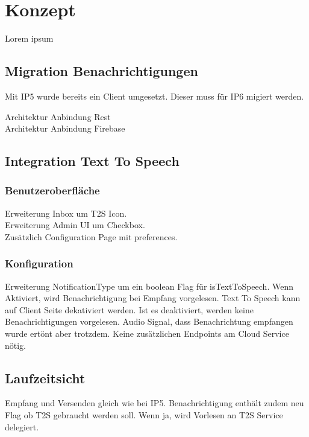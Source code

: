 \section{Konzept}

Lorem ipsum

\subsection{Migration Benachrichtigungen}

Mit IP5 wurde bereits ein Client umgesetzt.
Dieser muss für IP6 migiert werden.

Architektur Anbindung Rest \\
Architektur Anbindung Firebase \\

\clearpage


\subsection{Integration Text To Speech}

\subsubsection*{Benutzeroberfläche}

Erweiterung Inbox um T2S Icon. \\
Erweiterung Admin UI um Checkbox. \\
Zusätzlich Configuration Page mit preferences. \\

\subsubsection*{Konfiguration}
Erweiterung NotificationType um ein boolean Flag für isTextToSpeech.
Wenn Aktiviert, wird Benachrichtigung bei Empfang vorgelesen.
Text To Speech kann auf Client Seite dekativiert werden.
Ist es deaktiviert, werden keine Benachrichtigungen vorgelesen.
Audio Signal, dass Benachrichtung empfangen wurde ertönt aber trotzdem.
Keine zusätzlichen Endpoints am Cloud Service nötig. \\


\subsection*{Laufzeitsicht}

Empfang und Versenden gleich wie bei IP5.
Benachrichtigung enthält zudem neu Flag ob T2S gebraucht werden soll.
Wenn ja, wird Vorlesen an T2S Service delegiert.

